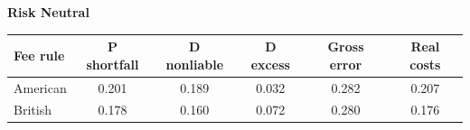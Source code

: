 \documentclass[10pt,border=5pt,varwidth=17cm]{standalone}
\begin{document}
\begingroup
\small
\setlength{\tabcolsep}{5pt}
\renewcommand{\arraystretch}{1.20}
\noindent\textbf{Risk Neutral}\par\smallskip
\noindent\begin{tabularx}{\linewidth}{@{}>{\raggedright\arraybackslash}Xccccc@{}}
\toprule
\textbf{Fee rule} & \textbf{P shortfall} & \textbf{D nonliable} & \textbf{D excess} & \textbf{Gross error} & \textbf{Real costs} \\
\midrule
American & 0.201 & 0.189 & 0.032 & 0.282 & 0.207 \\
British & 0.178 & 0.160 & 0.072 & 0.280 & 0.176 \\
\bottomrule\end{tabularx}\par\medskip
\endgroup
\end{document}
